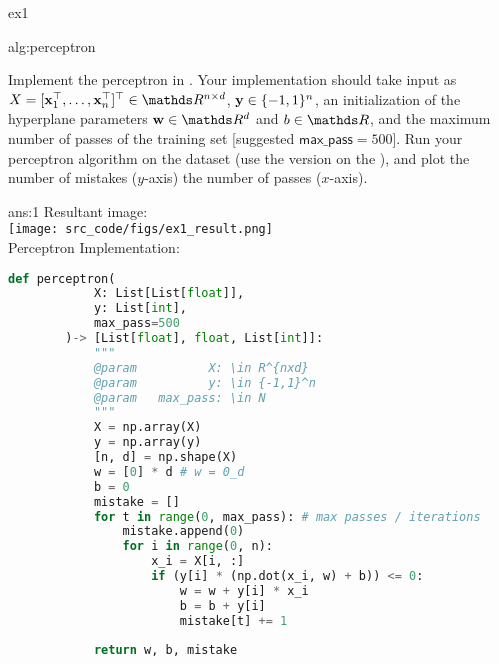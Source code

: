 \documentclass{tron}
\newcommand{\mref}[1]{\underline{\textbf{\hypersetup{linkcolor=orange}\Cref{#1}\hypersetup{linkcolor=blue}}}}
\begin{document}
\setcounter{section}{1}
\begin{exercise}{ex1}
		
\begin{algo}{alg:perceptron}
\DontPrintSemicolon
	
	
\end{algo}
	
Implement the perceptron in . Your implementation should take input as $X = [\xv_1^\top, \ldots, \xv_n^\top]^\top \in \RR^{n \times d}$, $\mathbf{y} \in \{-1,1\}^{n}$, an initialization of the hyperplane parameters $\wv\in\RR^{d}$ and $b\in \RR$, and the maximum number of passes of the training set [suggested $\mathsf{max\_pass} = 500$]. Run your perceptron algorithm on the \href{https://archive.ics.uci.edu/ml/datasets/spambase}{} dataset (use the version on the \href{http://www.gautamkamath.com/courses/CS480-wi2021.html}{}), and plot the number of mistakes ($y$-axis) \wrt the number of passes ($x$-axis).

\ans{\mref{ans:1}}
\end{exercise}
\begin{answer}[]{ans:1}
	Resultant image:\\
	\texttt{[image: src\_code/figs/ex1\_result.png]}
	\\
		
	Perceptron Implementation:
	\begin{lstlisting}[language=python]		
		def perceptron(
		    X: List[List[float]], 
		    y: List[int], 
		    max_pass=500
		)-> [List[float], float, List[int]]:
		    """
		    @param          X: \in R^{nxd}
		    @param          y: \in {-1,1}^n 
		    @param   max_pass: \in N
		    """
		    X = np.array(X)
		    y = np.array(y)
		    [n, d] = np.shape(X)
		    w = [0] * d # w = 0_d
		    b = 0
		    mistake = []
		    for t in range(0, max_pass): # max passes / iterations
		        mistake.append(0)
		        for i in range(0, n):
		            x_i = X[i, :]
		            if (y[i] * (np.dot(x_i, w) + b)) <= 0:
		                w = w + y[i] * x_i
		                b = b + y[i]
		                mistake[t] += 1
		    
		    return w, b, mistake
	\end{lstlisting}
\end{answer}
\end{document}

